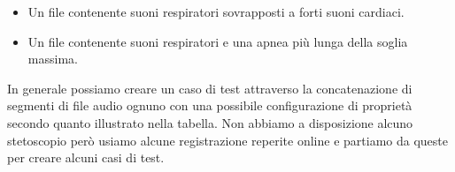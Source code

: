 \begin{itemize}
  \item
    Un file contenente suoni respiratori sovrapposti a forti suoni cardiaci. 
  \item
    Un file contenente suoni respiratori e una apnea pi\`u lunga della soglia massima.
\end{itemize}


In generale possiamo creare un caso di test attraverso la concatenazione di segmenti di file audio ognuno con una possibile configurazione di propriet\`a secondo quanto illustrato nella tabella.
Non abbiamo a disposizione alcuno stetoscopio per\`o usiamo alcune registrazione reperite online e partiamo da queste per creare alcuni casi di test.
